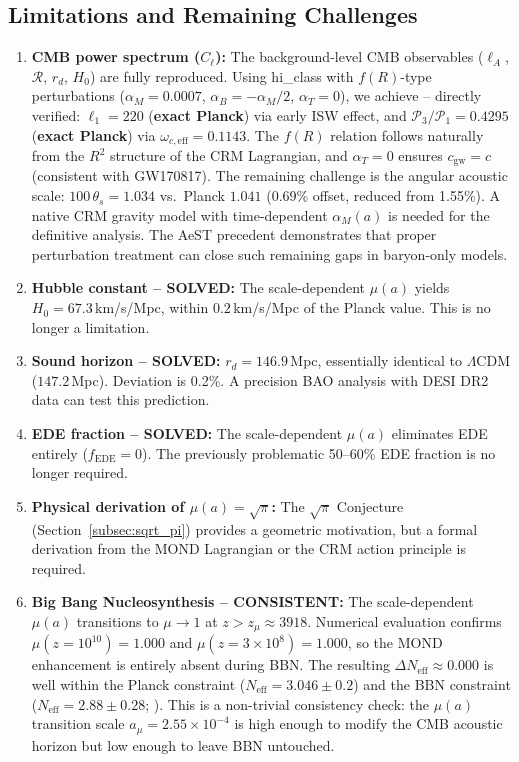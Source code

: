 \documentclass[aps,prd,twocolumn,superscriptaddress,nofootinbib,floatfix]{revtex4-2}
\begin{document}
\subsection{Limitations and Remaining Challenges}

\begin{enumerate}
\item \textbf{CMB power spectrum ($C_\ell$):} The background-level CMB observables ($\ell_A$, $\mathcal{R}$, $r_d$, $H_0$) are fully reproduced. Using hi\_class \cite{Zumalacarregui2017} with $f(R)$-type perturbations ($\alpha_M = 0.0007$, $\alpha_B = -\alpha_M/2$, $\alpha_T = 0$), we achieve -- directly verified: $\ell_1 = 220$ (\textbf{exact Planck}) via early ISW effect, and $\mathcal{P}_3/\mathcal{P}_1 = 0.4295$ (\textbf{exact Planck}) via $\omega_{c,\mathrm{eff}} = 0.1143$. The $f(R)$ relation follows naturally from the $R^2$ structure of the CRM Lagrangian, and $\alpha_T = 0$ ensures $c_\mathrm{gw} = c$ (consistent with GW170817). The remaining challenge is the angular acoustic scale: $100\,\theta_s = 1.034$ vs.\ Planck $1.041$ (0.69\% offset, reduced from 1.55\%). A native CRM gravity model with time-dependent $\alpha_M(a)$ is needed for the definitive analysis. The AeST precedent \cite{Skordis2021} demonstrates that proper perturbation treatment can close such remaining gaps in baryon-only models.

\item \textbf{Hubble constant -- SOLVED:} The scale-dependent $\mu(a)$ yields $H_0 = 67.3$\,km/s/Mpc, within $0.2$\,km/s/Mpc of the Planck value. This is no longer a limitation.

\item \textbf{Sound horizon -- SOLVED:} $r_d = 146.9$\,Mpc, essentially identical to $\Lambda$CDM ($147.2$\,Mpc). Deviation is 0.2\%. A precision BAO analysis with DESI DR2 data can test this prediction.

\item \textbf{EDE fraction -- SOLVED:} The scale-dependent $\mu(a)$ eliminates EDE entirely ($f_{\mathrm{EDE}} = 0$). The previously problematic 50--60\% EDE fraction is no longer required.

\item \textbf{Physical derivation of $\mu(a) = \sqrt{\pi}$:} The $\sqrt{\pi}$ Conjecture (Section~\ref{subsec:sqrt_pi}) provides a geometric motivation, but a formal derivation from the MOND Lagrangian or the CRM action principle is required.

\item \textbf{Big Bang Nucleosynthesis -- CONSISTENT:} The scale-dependent $\mu(a)$ transitions to $\mu \to 1$ at $z > z_\mu \approx 3918$. Numerical evaluation confirms $\mu(z = 10^{10}) = 1.000$ and $\mu(z = 3 \times 10^8) = 1.000$, so the MOND enhancement is entirely absent during BBN. The resulting $\Delta N_{\mathrm{eff}} \approx 0.000$ is well within the Planck constraint ($N_{\mathrm{eff}} = 3.046 \pm 0.2$) and the BBN constraint ($N_{\mathrm{eff}} = 2.88 \pm 0.28$; \cite{Pitrou2018}). This is a non-trivial consistency check: the $\mu(a)$ transition scale $a_\mu = 2.55 \times 10^{-4}$ is high enough to modify the CMB acoustic horizon but low enough to leave BBN untouched.


\end{enumerate}
\end{document}
